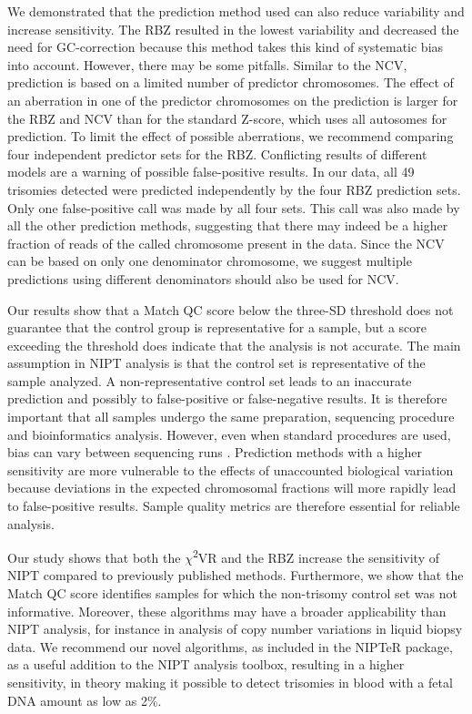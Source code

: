 We demonstrated that the prediction method used can also reduce variability and increase sensitivity. 
The RBZ resulted in the lowest variability and decreased the need for GC-correction because this method takes this kind of systematic bias into account. 
However, there may be some pitfalls. 
Similar to the NCV, prediction is based on a limited number of predictor chromosomes. 
The effect of an aberration in one of the predictor chromosomes on the prediction is larger for the RBZ and NCV than for the standard Z-score, which uses all autosomes for prediction. 
To limit the effect of possible aberrations, we recommend comparing four independent predictor sets for the RBZ. Conflicting results of different models are a warning of possible false-positive results. 
In our data, all 49 trisomies detected were predicted independently by the four RBZ prediction sets. 
Only one false-positive call was made by all four sets. 
This call was also made by all the other prediction methods, suggesting that there may indeed be a higher fraction of reads of the called chromosome present in the data. 
Since the NCV can be based on only one denominator chromosome, we suggest multiple predictions using different denominators should also be used for NCV.

Our results show that a Match QC score below the three-SD threshold does not guarantee that the control group is representative for a sample, but a score exceeding the threshold does indicate that the analysis is not accurate. 
The main assumption in NIPT analysis is that the control set is representative of the sample analyzed. 
A non-representative control set leads to an inaccurate prediction and possibly to false-positive or false-negative results. 
It is therefore important that all samples undergo the same preparation, sequencing procedure and bioinformatics analysis. 
However, even when standard procedures are used, bias can vary between sequencing runs \cite{Aird_2011}. 
Prediction methods with a higher sensitivity are more vulnerable to the effects of unaccounted biological variation because deviations in the expected chromosomal fractions will more rapidly lead to false-positive results. 
Sample quality metrics are therefore essential for reliable analysis.

Our study shows that both the $\chi$\textsuperscript{2}VR and the RBZ increase the sensitivity of NIPT compared to previously published methods. 
Furthermore, we show that the Match QC score identifies samples for which the non-trisomy control set was not informative. 
Moreover, these algorithms may have a broader applicability than NIPT analysis, for instance in analysis of copy number variations in liquid biopsy data. 
We recommend our novel algorithms, as included in the NIPTeR package, as a useful addition to the NIPT analysis toolbox, resulting in a higher sensitivity, in theory making it possible to detect trisomies in blood with a fetal DNA amount as low as 2\%.

